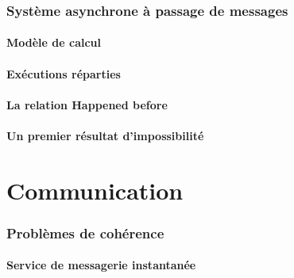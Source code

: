 \documentclass[9pt, handout]{beamer}
\begin{document}
\section{Système asynchrone à passage de messages}
 
\subsection{Modèle de calcul}




  
\subsection{Exécutions réparties}



 
\subsection{La relation Happened before}




 
\subsection{Un premier résultat d'impossibilité}

 
 
\part{Communication}
 
 
\section{Problèmes de cohérence}
 
\subsection{Service de messagerie instantanée}



 
\end{document}
